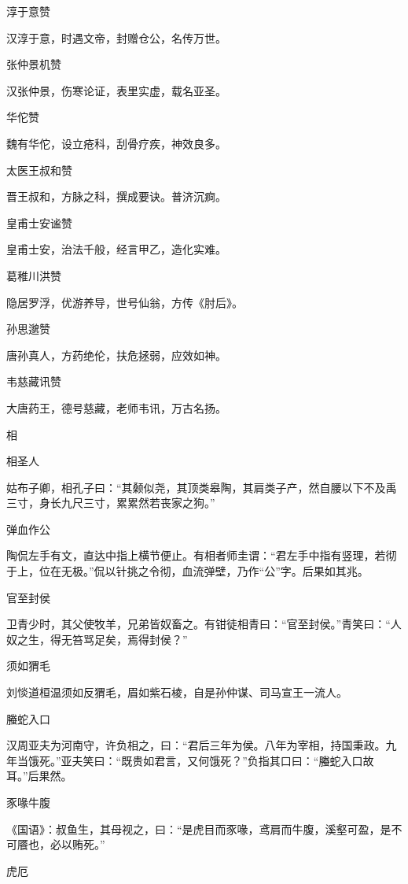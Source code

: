 \documentclass[a4paper,12pt,UTF8,twoside]{ctexbook}
\begin{document}
    淳于意赞
    
    汉淳于意，时遇文帝，封赠仓公，名传万世。
    
    张仲景机赞
    
    汉张仲景，伤寒论证，表里实虚，载名亚圣。
    
    华佗赞
    
    魏有华佗，设立疮科，刮骨疗疾，神效良多。
    
    太医王叔和赞
    
    晋王叔和，方脉之科，撰成要诀。普济沉痾。
    
    皇甫士安谧赞
    
    皇甫士安，治法千般，经言甲乙，造化实难。
    
    葛稚川洪赞
    
    隐居罗浮，优游养导，世号仙翁，方传《肘后》。
    
    孙思邈赞
    
    唐孙真人，方药绝伦，扶危拯弱，应效如神。
    
    韦慈藏讯赞
    
    大唐药王，德号慈藏，老师韦讯，万古名扬。
    
    相
    
    相圣人
    
    姑布子卿，相孔子曰：“其颡似尧，其顶类皋陶，其肩类子产，然自腰以下不及禹三寸，身长九尺三寸，累累然若丧家之狗。”
    
    弹血作公
    
    陶侃左手有文，直达中指上横节便止。有相者师圭谓：“君左手中指有竖理，若彻于上，位在无极。”侃以针挑之令彻，血流弹壁，乃作“公”字。后果如其兆。
    
    官至封侯
    
    卫青少时，其父使牧羊，兄弟皆奴畜之。有钳徒相青曰：“官至封侯。”青笑曰：“人奴之生，得无笞骂足矣，焉得封侯？”
    
    须如猬毛
    
    刘惔道桓温须如反猬毛，眉如紫石棱，自是孙仲谋、司马宣王一流人。
    
    螣蛇入口
    
    汉周亚夫为河南守，许负相之，曰：“君后三年为侯。八年为宰相，持国秉政。九年当饿死。”亚夫笑曰：“既贵如君言，又何饿死？”负指其口曰：“螣蛇入口故耳。”后果然。
    
    豕喙牛腹
    
    《国语》：叔鱼生，其母视之，曰：“是虎目而豕喙，鸢肩而牛腹，溪壑可盈，是不可餍也，必以贿死。”
    
    虎厄
    
\end{document}
